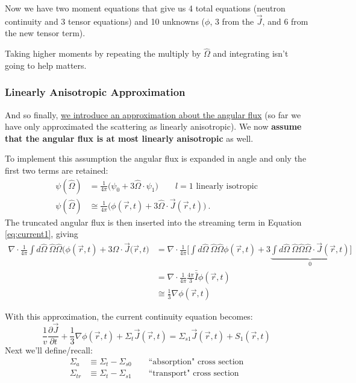 \documentclass[12pt]{article}
\newcommand{\vOmega}{\ensuremath{\hat{\Omega}}}
\begin{document}
Now we have two moment equations that give us 4 total equations (neutron continuity and 3 tensor equations) and 10 unknowns ($\phi$, 3 from the $\vec{J}$, and 6 from the new tensor term). 

Taking higher moments by repeating the multiply by $\vOmega$ and integrating isn't going to help matters.


\subsubsection{Linearly Anisotropic Approximation}
And so finally, \underline{we introduce an approximation about the angular flux} (so far we have only approximated the scattering as linearly anisotropic). We now \textbf{assume that the angular flux is at most linearly anisotropic} as well.

To implement this assumption the angular flux is expanded in angle and only the first two terms are retained:  
%
\begin{align}
\psi(\vOmega) &=  \frac{1}{4\pi}\bigl( \psi_{0} + 3\vOmega \cdot \psi_{1} \bigr) \qquad l=1 \text{ linearly isotropic} \\
%
\psi(\vOmega) &\cong \frac{1}{4\pi}\bigl(\phi(\vec{r}, t) + 3 \vOmega \cdot \vec{J}(\vec{r}, t)\bigr) \:.
  \label{eq:angExpand} 
\end{align}
The truncated angular flux is then inserted into the streaming term in Equation \eqref{eq:current1}, giving 
%
\begin{align}
  \nabla \cdot \frac{1}{4\pi} \int d \vOmega \:\vOmega \vOmega  \bigl(\phi(\vec{r}, t) + 3 \vOmega \cdot \vec{J}(\vec{r}, t\bigr) &=  
%
\nabla \cdot \frac{1}{4\pi} \bigl[\int d \vOmega \:\vOmega \vOmega  \phi(\vec{r}, t) 
%
+ 3 \underbrace{\int d \vOmega \:\vOmega \vOmega \vOmega \cdot \vec{J}(\vec{r}, t)}_{0} \bigr] \nonumber \\
% 
&= \nabla \cdot \frac{1}{4\pi} \frac{4\pi}{3}\bar{\bar{I}} \phi(\vec{r}, t) \\
%
  &\cong \frac{1}{3} \nabla \phi(\vec{r}, t) 
  \label{eq:firstTerm}
\end{align}

With this approximation, the current continuity equation becomes:
\begin{equation}
\frac{1}{v}\frac{\partial \vec{J}}{\partial t} 
+ \frac{1}{3} \nabla \phi(\vec{r}, t) +
\Sigma_t  \vec{J}(\vec{r}, t) =
\Sigma_{s1} \vec{J}(\vec{r},t)
+ S_{1}(\vec{r}, t) 
\label{eq:current1}
\end{equation}
%
Next we'll define/recall:
\begin{align}
\Sigma_a &\equiv \Sigma_t - \Sigma_{s0} \qquad \text{``absorption" cross section}\\
\Sigma_{tr} &\equiv \Sigma_t - \Sigma_{s1} \qquad \text{``transport" cross section}
\end{align}
\end{document}
